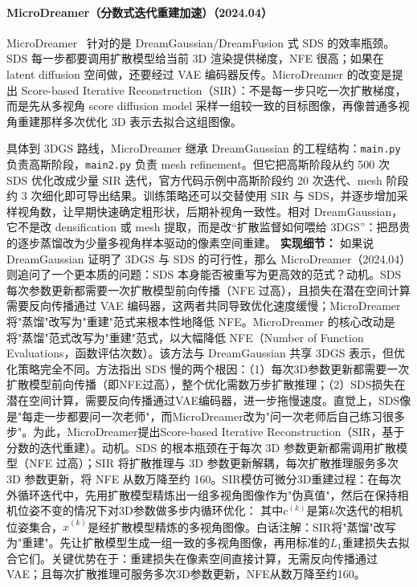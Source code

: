 \paragraph{MicroDreamer（分数式迭代重建加速）（2024.04）}
MicroDreamer~\cite{2404_19525} 针对的是 DreamGaussian/DreamFusion 式 SDS 的效率瓶颈。SDS 每一步都要调用扩散模型给当前 3D 渲染提供梯度，NFE 很高；如果在 latent diffusion 空间做，还要经过 VAE 编码器反传。MicroDreamer 的改变是提出 Score-based Iterative Reconstruction（SIR）：不是每一步只吃一次扩散梯度，而是先从多视角 score diffusion model 采样一组较一致的目标图像，再像普通多视角重建那样多次优化 3D 表示去拟合这组图像。

具体到 3DGS 路线，MicroDreamer 继承 DreamGaussian 的工程结构：\texttt{main.py} 负责高斯阶段，\texttt{main2.py} 负责 mesh refinement。但它把高斯阶段从约 500 次 SDS 优化改成少量 SIR 迭代，官方代码示例中高斯阶段约 20 次迭代、mesh 阶段约 3 次细化即可导出结果。训练策略还可以交替使用 SIR 与 SDS，并逐步增加采样视角数，让早期快速确定粗形状，后期补视角一致性。相对 DreamGaussian，它不是改 densification 或 mesh 提取，而是改“扩散监督如何喂给 3DGS”：把昂贵的逐步蒸馏改为少量多视角样本驱动的像素空间重建。
\textbf{实现细节：} 如果说 DreamGaussian 证明了 3DGS 与 SDS 的可行性，那么 MicroDreamer（2024.04） 则追问了一个更本质的问题：SDS 本身能否被重写为更高效的范式？动机。SDS 每次参数更新都需要一次扩散模型前向传播（NFE 过高），且损失在潜在空间计算需要反向传播通过 VAE 编码器，这两者共同导致优化速度缓慢；MicroDreamer 将"蒸馏"改写为"重建"范式来根本性地降低 NFE。MicroDreamer 的核心改动是将"蒸馏"范式改写为"重建"范式，以大幅降低 NFE（Number of Function Evaluations，函数评估次数）。该方法与 DreamGaussian 共享 3DGS 表示，但优化策略完全不同。方法指出 SDS 慢的两个根因：（1）每次3D参数更新都需要一次扩散模型前向传播（即NFE过高），整个优化需数万步扩散推理；（2）SDS损失在潜在空间计算，需要反向传播通过VAE编码器，进一步拖慢速度。直觉上，SDS像是"每走一步都要问一次老师"，而MicroDreamer改为"问一次老师后自己练习很多步"。为此，MicroDreamer提出Score-based Iterative Reconstruction（SIR，基于分数的迭代重建）。动机。SDS 的根本瓶颈在于每次 3D 参数更新都需调用扩散模型（NFE 过高）；SIR 将扩散推理与 3D 参数更新解耦，每次扩散推理服务多次 3D 参数更新，将 NFE 从数万降至约 160。SIR模仿可微分3D重建过程：在每次外循环迭代中，先用扩散模型精炼出一组多视角图像作为"伪真值"，然后在保持相机位姿不变的情况下对3D参数做多步内循环优化： 其中$c^{(k)}$是第$k$次迭代的相机位姿集合，$\hat{x}^{(k)}$是经扩散模型精炼的多视角图像。白话注解：SIR将"蒸馏"改写为"重建"。先让扩散模型生成一组一致的多视角图像，再用标准的$L_1$重建损失去拟合它们。关键优势在于：重建损失在像素空间直接计算，无需反向传播通过VAE；且每次扩散推理可服务多次3D参数更新，NFE从数万降至约160。
